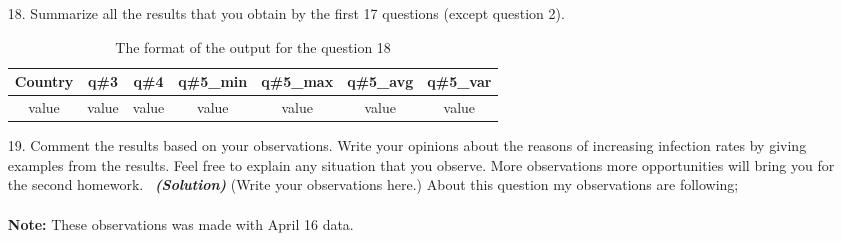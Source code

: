 \documentclass[a4 paper]{article}
\numberwithin{equation}{section}
\newcommand{\solution}{~\newline\textbf{\textit{(Solution)}} }
\newcommand{\0}{\mathbf{0}}
\begin{document}
\begin{itemize}
\begin{table}[ht]
\begin{tabular}{c c c c}
			\hline %
		\end{tabular}\label{table:nonlin}%
	\end{table}
	\item[18. ] Summarize all the results that you obtain by the first 17 questions (except question 2). 
	\begin{table}[ht]
		\caption{The format of the output for the question 18} %
		\centering  %
		\begin{tabular}{c c c c c c c}%
			\hline\hline       %
			Country & q\#3 & q\#4 & q\#5\_min &  q\#5\_max & q\#5\_avg &  q\#5\_var  \\ 
			[0.5ex]%
			\hline      %
			 value & value & value & value & value & value & value\\%

			\hline %
		\end{tabular}\label{table:nonlin}%
	\end{table}
	\item[19. ] Comment the results based on your observations. Write your opinions about the reasons of increasing infection rates by giving examples from the results. Feel free to explain any situation that you observe. More observations more opportunities will bring you for the second homework. 
	\solution (Write your observations here.)
	\cleardoublepage
	About this question my observations are following; \\ \\
\textbf{Note:} These observations was made with April 16 data.


\end{itemize}
\end{document}
